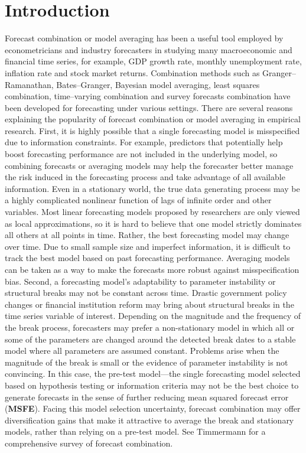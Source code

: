 \section{Introduction}
Forecast combination or model averaging has been a useful tool employed by econometricians and industry forecasters in studying many macroeconomic and financial time series, for example, GDP growth rate, monthly unemployment rate, inflation rate and stock market returns. Combination methods such as Granger--Ramanathan, Bates--Granger, Bayesian model averaging, least squares combination, time--varying combination and survey forecasts combination have been developed for forecasting under various settings. There are several reasons explaining the popularity of forecast combination or model averaging in empirical research. First, it is highly possible that a single forecasting model is misspecified due to information constraints. For example, predictors that potentially help boost forecasting performance are not included in the underlying model, so combining forecasts or averaging models may help the forecaster better manage the risk induced in the forecasting process and take advantage of all available information. Even in a stationary world, the true data generating process may be a highly complicated nonlinear function of lags of infinite order and other variables. Most linear forecasting models proposed by researchers are only viewed as local approximations, so it is hard to believe that one model strictly dominates all others at all points in time. Rather, the best forecasting model may change over time. Due to small sample size and imperfect information, it is difficult to track the best model based on past forecasting performance. Averaging models can be taken as a way to make the forecasts more robust against misspecification bias. Second, a forecasting model's adaptability to parameter instability or structural breaks may not be constant across time. Drastic government policy changes or financial institution reform may bring about structural breaks in the time series variable of interest. Depending on the magnitude and the frequency of the break process, forecasters may prefer a non-stationary model in which all or some of the parameters are changed around the detected break dates to a stable model where all parameters are assumed constant. Problems arise when the magnitude of the break is small or the evidence of parameter instability is not convincing. In this case, the pre-test model---the single forecasting model selected based on hypothesis testing or information criteria may not be the best choice to generate forecasts in the sense of further reducing mean squared forecast error (\textbf{MSFE}). Facing this model selection uncertainty, forecast combination may offer diversification gains that make it attractive to average the break and stationary models, rather than relying on a pre-test model. See Timmermann \cite{timmermann2006forecast} for a comprehensive survey of forecast combination.

